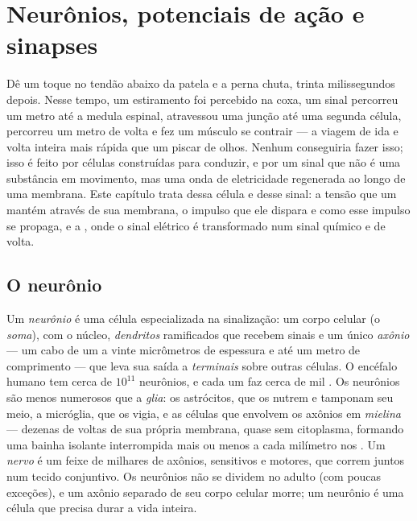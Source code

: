 \chapter{Neurônios, potenciais de ação e sinapses}\label{ch:b2:neurons-synapses}

Dê um toque no tendão abaixo da patela e a perna chuta, trinta
milissegundos depois. Nesse tempo, um estiramento foi percebido na
coxa, um sinal percorreu um metro até a medula espinal, atravessou uma
junção até uma segunda célula, percorreu um metro de volta e fez um
músculo se contrair --- a viagem de ida e volta inteira mais rápida que
um piscar de olhos. Nenhum  conseguiria fazer isso; isso é
feito por células construídas para conduzir, e por um sinal que não é
uma substância em movimento, mas uma onda de eletricidade regenerada ao
longo de uma membrana. Este capítulo trata dessa célula e desse sinal:
a tensão que um  mantém através de sua membrana, o impulso que
ele dispara e como esse impulso se propaga, e a , onde o sinal
elétrico é transformado num sinal químico e de volta.

\section{O neurônio}

\begin{definition}\label{def:b2:neurons-synapses:neuron}
Um \emph{neurônio} é uma célula especializada na sinalização: um corpo
celular (o \emph{soma}), com o núcleo, \emph{dendritos} ramificados que
recebem sinais e um único \emph{axônio} --- um cabo de um a vinte
micrômetros de espessura e até um metro de comprimento --- que leva sua
saída a \emph{terminais} sobre outras células. O encéfalo humano tem
cerca de $10^{11}$ neurônios, e cada um faz cerca de mil . Os
neurônios são menos numerosos que a \emph{glia}: os astrócitos, que os
nutrem e tamponam seu meio, a micróglia, que os vigia, e as células que
envolvem os axônios em \emph{mielina} --- dezenas de voltas de sua
própria membrana, quase sem citoplasma, formando uma bainha isolante
interrompida mais ou menos a cada milímetro nos \emph{}.
Um \emph{nervo} é um feixe de milhares de axônios, sensitivos e motores,
que correm juntos num tecido conjuntivo. Os neurônios não se dividem no
adulto (com poucas exceções), e um axônio separado de seu corpo celular
morre; um neurônio é uma célula que precisa durar a vida inteira.
\end{definition}

